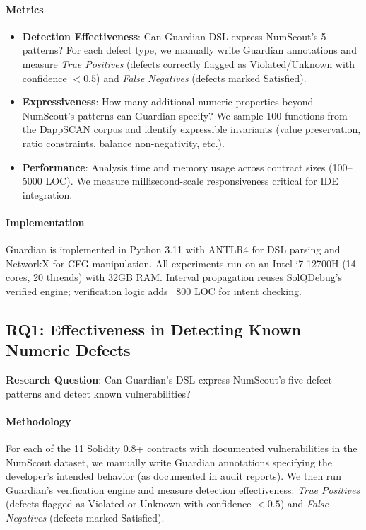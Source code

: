 \documentclass[pdflatex,sn-basic]{sn-jnl}%
\theoremstyle{thmstyleone}%
\theoremstyle{thmstyletwo}%
\theoremstyle{thmstylethree}%
\begin{document}
\paragraph{Metrics}
\begin{itemize}
    \item \textbf{Detection Effectiveness}: Can Guardian DSL express NumScout's 5 patterns? For each defect type, we manually write Guardian annotations and measure \textit{True Positives} (defects correctly flagged as Violated/Unknown with confidence $< 0.5$) and \textit{False Negatives} (defects marked Satisfied).
    \item \textbf{Expressiveness}: How many additional numeric properties beyond NumScout's patterns can Guardian specify? We sample 100 functions from the DappSCAN corpus and identify expressible invariants (value preservation, ratio constraints, balance non-negativity, etc.).
    \item \textbf{Performance}: Analysis time and memory usage across contract sizes (100--5000 LOC). We measure millisecond-scale responsiveness critical for IDE integration.
\end{itemize}

\paragraph{Implementation}
Guardian is implemented in Python 3.11 with ANTLR4 for DSL parsing and NetworkX for CFG manipulation. All experiments run on an Intel i7-12700H (14 cores, 20 threads) with 32GB RAM. Interval propagation reuses SolQDebug's verified engine; verification logic adds ~800 LOC for intent checking.


\subsection{RQ1: Effectiveness in Detecting Known Numeric Defects}
\label{sec:rq1}

\textbf{Research Question}: Can Guardian's DSL express NumScout's five defect patterns and detect known vulnerabilities?

\paragraph{Methodology}
For each of the 11 Solidity 0.8+ contracts with documented vulnerabilities in the NumScout dataset, we manually write Guardian annotations specifying the developer's intended behavior (as documented in audit reports). We then run Guardian's verification engine and measure detection effectiveness: \textit{True Positives} (defects flagged as Violated or Unknown with confidence $< 0.5$) and \textit{False Negatives} (defects marked Satisfied).
\end{document}
